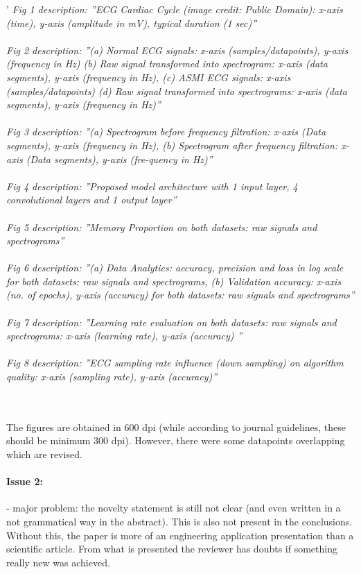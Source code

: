 \documentclass{article}
\begin{document}
'\textit{
Fig 1 description: ''ECG Cardiac Cycle (image credit: Public Domain): x-axis (time), y-axis (amplitude in mV),     typical duration (1 sec)''\\\\
Fig 2 description: ''(a) Normal ECG signals: x-axis (samples/datapoints), y-axis (frequency in Hz) (b) Raw signal transformed into spectrogram: x-axis (data segments), y-axis (frequency in Hz), (c) ASMI ECG signals: x-axis (samples/datapoints) (d) Raw signal transformed into spectrograms: x-axis (data segments), y-axis (frequency in Hz)''\\\\
Fig 3 description: ''(a) Spectrogram before frequency filtration: x-axis (Data segments), y-axis (frequency in Hz), (b) Spectrogram after frequency filtration: x-axis (Data segments), y-axis (fre-quency in Hz)''\\\\
Fig 4 description: ''Proposed model architecture with 1 input layer, 4 convolutional layers and 1 output layer''\\\\
Fig 5 description: ''Memory Proportion on both datasets: raw signals and spectrograms''\\\\
Fig 6 description: ''(a) Data Analytics: accuracy, precision and loss in log scale for both datasets: raw signals and spectrograms, (b) Validation accuracy: x-axis (no. of epochs), y-axis (accuracy) for both datasets: raw signals and spectrograms''\\\\
Fig 7 description: ''Learning rate evaluation on both datasets: raw signals and spectrograms: x-axis (learning rate), y-axis (accuracy) ''\\\\
Fig 8 description: ''ECG sampling rate influence (down sampling) on algorithm quality: x-axis (sampling rate), y-axis (accuracy)''\\\\\\
}

The figures are obtained in 600 dpi (while according to journal guidelines, these should be minimum 300 dpi). However, there were some datapoints overlapping which are revised. 


\paragraph{Issue 2:}
\begin{displayquote}
- major problem: the novelty statement is still not clear (and even written in a not grammatical way in the abstract). This is also not present in the conclusions. Without this, the paper is more of an engineering application presentation than a scientific article. From what is presented the reviewer has doubts if something really new was achieved.
\end{displayquote}
\end{document}
